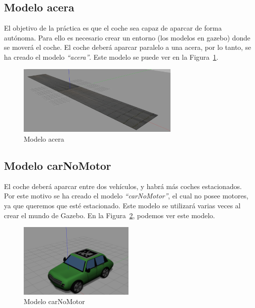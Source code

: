 \subsection{Modelo acera} \label{sec.acera}
El objetivo de la práctica es que el coche sea capaz de aparcar de forma autónoma. Para ello es necesario crear un entorno (los modelos en gazebo) donde se moverá el coche. El coche deberá aparcar paralelo a una acera, por lo tanto, se ha creado el modelo \textit{``acera''}. Este modelo se puede ver en la Figura~\ref{fig.acera}.

\begin{figure}[H]
  \begin{center}
    \includegraphics[width=0.7\textwidth]{figures/Autopark/acera.png}
		\caption{Modelo acera}
		\label{fig.acera}
		\end{center}
\end{figure}

\subsection{Modelo carNoMotor}
El coche deberá aparcar entre dos vehículos, y habrá más coches estacionados. Por este motivo se ha creado el modelo \textit{``carNoMotor''}, el cual no posee motores, ya que queremos que esté estacionado. Este modelo se utilizará varias veces al crear el mundo de Gazebo. En la Figura~\ref{fig.carNoMotor}, podemos ver este modelo.

\begin{figure}[H]
  \begin{center}
    \includegraphics[width=0.5\textwidth]{figures/Autopark/carNoMotor.png}
		\caption{Modelo carNoMotor}
		\label{fig.carNoMotor}
		\end{center}
\end{figure}

